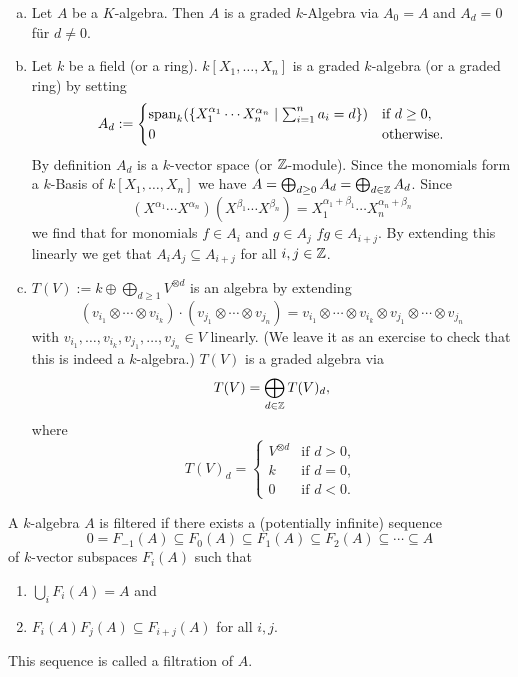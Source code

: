 \begin{expls}\leavevmode
 \begin{enumerate}[a)]
  \item
  Let $A$ be a $K$-algebra. Then $A$ is a graded $k$-Algebra via $A_0 = A$ and $A_d = 0$ für $d \neq 0$.
  
  \item
  Let $k$ be a field (or a ring). $k[X_1, \dotsc, X_n]$ is a graded $k$-algebra (or a graded ring) by setting
  \[
   A_d :=
   \begin{cases}
    \operatorname{span}_k(\{X_1^{\alpha_1} \dotsm X_n^{\alpha_n} \mid \sum_{i=1}^n a_i = d\}) & \text{if } d \geq 0, \\
    0                                                                            & \text{otherwise}.
   \end{cases}
  \]
  By definition $A_d$ is a $k$-vector space (or $\mathbb{Z}$-module). Since the monomials form a $k$-Basis of $k[X_1, \dotsc, X_n]$ we have $A = \bigoplus_{d \geq 0} A_d = \bigoplus_{d \in \mathbb{Z}} A_d$. Since
  \[
   \left( X^{\alpha_1} \dotsm X^{\alpha_n} \right) \left( X^{\beta_1} \dotsm X^{\beta_n} \right)
   = X_1^{\alpha_1+\beta_1} \dotsm X_n^{\alpha_n+\beta_n}
  \]
  we find that for monomials $f \in A_i$ and $g \in A_j$ $fg \in A_{i+j}$. By extending this linearly we get that $A_i A_j \subseteq A_{i+j}$ for all $i,j \in \mathbb{Z}$.
  
  
  \item
  $T(V) := k \oplus \bigoplus_{d \geq 1} V^{\otimes d}$ is an algebra by extending
  \[
   (v_{i_1} \otimes \dotsb \otimes v_{i_k}) \cdot (v_{j_1} \otimes \dotsb \otimes v_{j_n})
   = v_{i_1} \otimes \dotsb \otimes v_{i_k} \otimes v_{j_1} \otimes \dotsb \otimes v_{j_n}
  \]
  with $v_{i_1}, \dotsc, v_{i_k}, v_{j_1}, \dotsc, v_{j_n} \in V$ linearly. (We leave it as an exercise to check that this is indeed a $k$-algebra.) $T(V)$ is a graded algebra via
  \[
   T(V) = \bigoplus_{d \in \mathbb{Z}} T(V)_d,
  \]
  where
  \[
   T(V)_d =
   \begin{cases}
    V^{\otimes d} & \text{if } d > 0, \\
    k             & \text{if } d = 0, \\
    0             & \text{if } d < 0.
   \end{cases}
  \]
 \end{enumerate}
\end{expls}


\begin{defi}
 A $k$-algebra $A$ is filtered if there exists a (potentially infinite) sequence
 \[
  0 = F_{-1}(A) \subseteq F_0(A) \subseteq F_1(A) \subseteq F_2(A) \subseteq \dotsb \subseteq A
 \]
 of $k$-vector subspaces $F_i(A)$ such that
 \begin{enumerate}[1)]
  \item $\bigcup_i F_i(A) = A$ and
  \item $F_i(A) F_j(A) \subseteq F_{i+j}(A)$ for all $i,j$.
 \end{enumerate}
 This sequence is called a filtration of $A$.
\end{defi}


